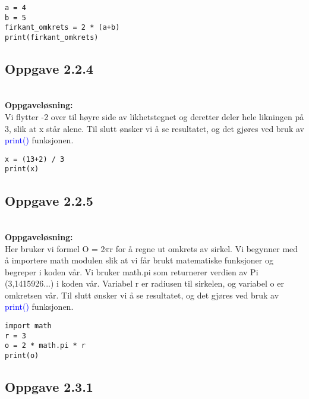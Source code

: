 \begin{lstlisting}
a = 4
b = 5
firkant_omkrets = 2 * (a+b)
print(firkant_omkrets)
\end{lstlisting}

\subsection{Oppgave 2.2.4}
\\

\textbf{Oppgaveløsning:}\\
Vi flytter -2 over til høyre side av likhetstegnet og deretter deler hele likningen på 3, slik at {\ttfamily x} står alene. Til slutt ønsker vi å se resultatet, og det gjøres ved bruk av {\ttfamily\textcolor{blue}{print()}} funksjonen.

\begin{lstlisting}
x = (13+2) / 3
print(x)
\end{lstlisting}

\subsection{Oppgave 2.2.5}
\\

\textbf{Oppgaveløsning:}\\
Her bruker vi formel O = 2$\pi$r for å regne ut omkrets av sirkel. Vi begynner med å importere {\ttfamily math} modulen slik at vi får brukt matematiske funksjoner og begreper i koden vår. Vi bruker {\ttfamily math.pi} som returnerer verdien av Pi (3,1415926...) i koden vår. Variabel {\ttfamily r} er radiusen til sirkelen, og variabel {\ttfamily o} er omkretsen vår. Til slutt ønsker vi å se resultatet, og det gjøres ved bruk av {\ttfamily\textcolor{blue}{print()}} funksjonen.

\begin{lstlisting}
import math
r = 3
o = 2 * math.pi * r 
print(o)
\end{lstlisting}

\subsection{Oppgave 2.3.1}
\\\\

